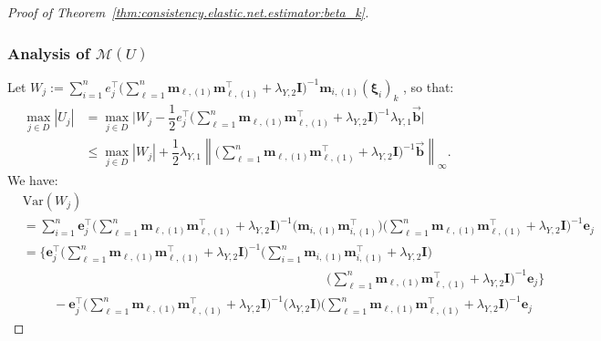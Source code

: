 \documentclass[
  12pt]{article}
\newcommand{\Var}{\mbox{Var}}
\def\M{\mathbf{m}}
\begin{document}
\begin{proof}[Proof of Theorem~\ref{thm:consistency.elastic.net.estimator:beta_k}]
	\subsubsection*{Analysis of $\mathcal{M}(U)$}
	Let $W_{j} :=  \sum_{i = 1}^{n} e_{j}^{\top} \big( \sum_{\ell = 1}^{n} \M_{\ell , (1)} \M_{\ell , (1)}^{\top}  + \lambda_{Y,2} \mathbf{I} \big)^{-1}  \M_{i,(1)} (\bm{\xi
    }_{i})_{k} $ , so that: 
	\begin{align*}
		\max_{j \in  D} |U_{j}|  &=  \max_{j \in  D} \Big| W_{j} - \dfrac{1}{2}     e_{j}^{\top} \Big(  \sum_{\ell = 1}^{n} \M_{\ell , (1)} \M_{\ell , (1)}^{\top}  +   \lambda_{Y,2} \mathbf{I} \Big)^{-1}    \lambda_{Y,1} \overrightarrow{\mathbf{b}} 
		\Big|
		\\
		&\leq  
		\max_{j \in  D} |W_{j}|  +  \dfrac{1}{2} \lambda_{Y,1} \left\|   \Big(  \sum_{\ell = 1}^{n} \M_{\ell , (1)}  \M_{\ell , (1)}^{\top}  +   \lambda_{Y,2} \mathbf{I} \Big)^{-1}    \overrightarrow{\mathbf{b}}   \right\|_{\infty}.
	\end{align*}
    We have: 
	\begin{align*}
		& \Var(W_{j})  
		\\  
		&=     \sum_{i = 1}^{n} \mathbf{e}_{j}^{\top} \Big(  \sum_{\ell = 1}^{n} \M_{\ell , (1)} \M_{\ell , (1)}^{\top}  +  \lambda_{Y,2} \mathbf{I} \Big)^{-1}  \Big(  \M_{i,(1)} \M_{i,(1)}^{\top}   \Big)  \Big(  \sum_{\ell = 1}^{n} \M_{\ell , (1)} \M_{\ell , (1)}^{\top}   +   \lambda_{Y,2} \mathbf{I} \Big)^{-1}  \mathbf{e}_{j}
		\\
		&=    \Big\{     \mathbf{e}_{j}^{\top} \Big(  \sum_{\ell = 1}^{n} \M_{\ell , (1)} \M_{\ell , (1)}^{\top}  +  \lambda_{Y,2} \mathbf{I} \Big)^{-1}  \Big(    \sum_{i = 1}^{n}  \M_{i,(1)} \M_{i,(1)}^{\top}  +  \lambda_{Y,2} \mathbf{I}  \Big)  
		\\
		& \hspace{10cm}  \Big( \sum_{\ell = 1}^{n} \M_{\ell , (1)} \M_{\ell , (1)}^{\top}   +   \lambda_{Y,2} \mathbf{I} \Big)^{-1}  \mathbf{e}_{j}  \Big\}
		\\
		& \hspace{1cm} -        \mathbf{e}_{j}^{\top} \Big(  \sum_{\ell = 1}^{n} \M_{\ell , (1)} \M_{\ell , (1)}^{\top}  +  \lambda_{Y,2} \mathbf{I} \Big)^{-1}  \Big( \lambda_{Y,2} \mathbf{I}  \Big)  \Big(  \sum_{\ell = 1}^{n} \M_{\ell , (1)} \M_{\ell , (1)}^{\top}   +   \lambda_{Y,2} \mathbf{I} \Big)^{-1}  \mathbf{e}_{j} 

\end{align*}
\end{proof}
\end{document}
